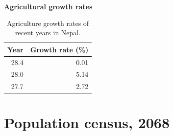 \documentclass[
]{book}
\begin{document}
\textbf{Agricultural growth rates}

\begin{table}

\caption{\label{tab:unnamed-chunk-3}Agriculture growth rates of recent years in Nepal.}
\centering
\begin{tabular}[t]{rr}
\toprule
Year & Growth rate (\%)\\
\midrule
28.4 & 0.01\\
28.0 & 5.14\\
27.7 & 2.72\\
\bottomrule
\end{tabular}
\end{table}

\hypertarget{population-census-2068}{%
\section{Population census, 2068}\label{population-census-2068}}
\end{document}
